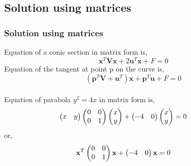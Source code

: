 \documentclass{beamer}
\begin{document}
 \begin{frame}
 \section{Solution using matrices}
 \frametitle{Solution using matrices}
 Equation of a conic section in matrix form is,
 \begin{equation}
  \textbf{x}^T\textbf{Vx} + 2\textbf{u}^T\textbf{x}+F=0   
 \end{equation}
 Equation of the tangent at point p on the curve is,
 \begin{equation}
 (\textbf{p}^T\textbf{V}+\textbf{u}^T)\textbf{x}+\textbf{p}^T\textbf{u}+F=0    
 \end{equation}
 \\Equation of parabola \(y^2=4x\) in matrix form is, 
 \begin{equation}
     
 
 \begin{pmatrix}
 x&y
 \end{pmatrix}\begin{pmatrix}
 0&0\\
 0&1
  \end{pmatrix}\begin{pmatrix}
 x\\
 y\\

 \end{pmatrix}+\begin{pmatrix}
 -4&0
 \end{pmatrix}\begin{pmatrix}
 x\\
 y\\
 \end{pmatrix}
 = 0 \hspace{10mm}
 \end{equation}
 or,
 \begin{equation}
     
 
 \textbf{x}^T\begin{pmatrix}
 0&0\\
 0&1\\
 \end{pmatrix}\textbf{x}+\begin{pmatrix}
 -4&0\\
 \end{pmatrix}\textbf{x}=0 \hspace{10mm}        
 \end{equation}
 \end{frame}
\end{document}
